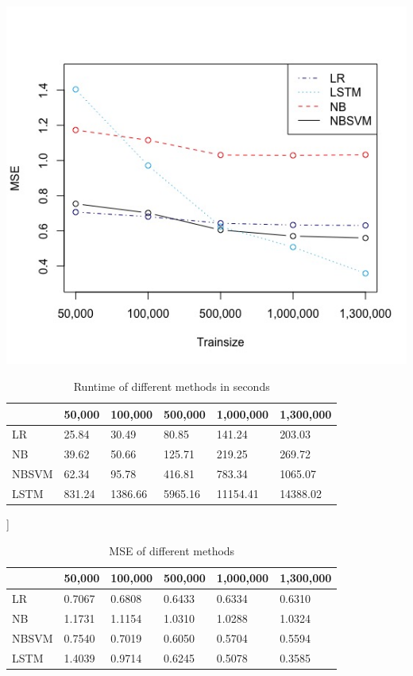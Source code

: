 \documentclass[letterpaper]{article} %
\begin{document}
\begin{center}
\centering
\label{fig:mse}
\includegraphics[width=\columnwidth]{../Plots/Compare_mse.jpeg}
\end{center}

\begin{table}
\centering
\caption{Runtime of different methods in seconds}
\label{table:runtime}
\begin{tabular}{l | lllll}
      & 50,000 & 100,000 & 500,000 & 1,000,000 & 1,300,000 \\ \hline
LR    & 25.84  & 30.49   & 80.85   & 141.24    & 203.03    \\
NB    & 39.62  & 50.66   & 125.71  & 219.25    & 269.72    \\
NBSVM & 62.34  & 95.78   & 416.81  & 783.34    & 1065.07   \\
LSTM  & 831.24 & 1386.66 & 5965.16 & 11154.41  & 14388.02 
\end{tabular}
\end{table}

\begin{table}]
\centering
\caption{MSE of different methods}
\label{table:mse}
\begin{tabular}{l | lllll}
      & 50,000 & 100,000 & 500,000 & 1,000,000 & 1,300,000 \\ \hline
LR    & 0.7067 & 0.6808  & 0.6433  & 0.6334    & 0.6310    \\
NB    & 1.1731 & 1.1154  & 1.0310  & 1.0288    & 1.0324    \\
NBSVM & 0.7540 & 0.7019  & 0.6050  & 0.5704    & 0.5594    \\
LSTM  & 1.4039 & 0.9714  & 0.6245  & 0.5078    & 0.3585   
\end{tabular}
\end{table}
\end{document}
